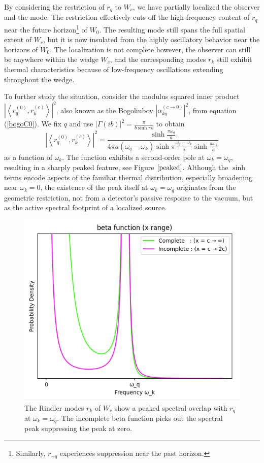 \documentclass[12pt,a4paper]{article}
\begin{document}
By considering the restriction of $r_q$ to $W_c$, we have partially localized the observer and the mode. The restriction effectively cuts off the high-frequency content of $r_q$ near the future horizon\footnote{Similarly, $r_{-q}$ experiences suppression near the past horizon.} of $W_0$. The resulting mode still spans the full spatial extent of $W_c$, but it is now insulated from the highly oscillatory behavior near the horizons of $W_0$.  The localization is not complete however, the observer can still be anywhere within the wedge $W_c$, and the corresponding modes $r_k$ still exhibit thermal characteristics because of low-frequency oscillations extending throughout the wedge.

To further study the situation, consider the modulus squared inner product $\left|\left<r_q^{(0)}, r_k^{(c)} \right>\right|^2$, also known as the Bogoliubov $\left|\alpha^{(c \rightarrow 0)}_{kq}\right|^2$, from equation (\ref{bogoC0}).  We fix $q$ and use $|\Gamma(ib)|^2 = \frac{\pi}{b \sinh \pi b}$ to obtain
\begin{equation}
  \left|\left<r_q^{(0)}, r_k^{(c)} \right>\right|^2 = \frac{\sinh \frac{\pi \omega_q}{a}}{4\pi a (\omega_q - \omega_k) \sinh \pi \frac{\omega_q - \omega_k}{a} \sinh \frac{\pi \omega_k}{a}}
\end{equation}
as a function of $\omega_k$. The function exhibits a second-order pole at $\omega_k = \omega_q$, resulting in a sharply peaked feature, see Figure $\ref{peaked}$. Although the $\sinh$ terms encode aspects of the familiar thermal distribution, especially broadening near $\omega_k = 0$, the existence of the peak itself at $\omega_k = \omega_q$ originates from the geometric restriction, not from a detector’s passive response to the vacuum, but as the active spectral footprint of a localized source.

\begin{figure}[h]
  \centering
\includegraphics[scale=0.6]{peaked.png}
\caption{The Rindler modes $r_k$ of $W_c$ show a peaked spectral overlap with $r_q$ at $\omega_k = \omega_q$. The incomplete beta function picks out the spectral peak suppressing the peak at zero.}
\label{peaked}
\end{figure}
\end{document}

